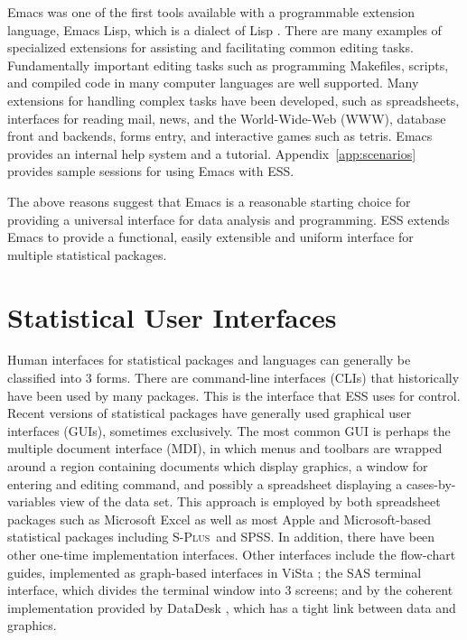 \documentclass{article}
\newcommand*{\Splus}{\textsc{S-Plus}}
\begin{document}
Emacs was one of the first tools available with a programmable
extension language, Emacs Lisp, which is a dialect of Lisp
\citep{RChassell1999,PGraham:1996}.  There are many examples of
specialized extensions for assisting and facilitating common editing
tasks.  Fundamentally important editing tasks such as programming
Makefiles, scripts, and compiled code in many computer languages are
well supported.  Many extensions for handling complex tasks have been
developed, such as spreadsheets, interfaces for reading mail, news,
and the World-Wide-Web (WWW), database front and backends, forms
entry, and interactive games such as tetris.  Emacs provides an
internal help system and a tutorial.  Appendix~\ref{app:scenarios}
provides sample sessions for using Emacs with ESS.

The above reasons suggest that Emacs is a reasonable starting choice
for providing a universal interface for data analysis and programming.
ESS extends Emacs to provide a functional, easily extensible and uniform
interface for multiple statistical packages.  


\section{Statistical User Interfaces}
\label{sec:UI}

Human interfaces for statistical packages and languages can generally
be classified into 3 forms.  There are command-line interfaces (CLIs)
that historically have been used by many packages.  This is the
interface that ESS uses for control.  Recent versions of statistical
packages have generally used graphical user interfaces (GUIs),
sometimes exclusively.  The most common GUI is perhaps the multiple
document interface (MDI), in which menus and toolbars are wrapped
around a region containing documents which display graphics, a window
for entering and editing command, and possibly a spreadsheet
displaying a cases-by-variables view of the data set.  This approach
is employed by both spreadsheet packages such as Microsoft Excel as
well as most Apple and Microsoft-based statistical packages including
\Splus\ and SPSS.  In addition, there have been other one-time
implementation interfaces.  Other interfaces include the flow-chart
guides, implemented as graph-based interfaces in ViSta
\citep{youn:lubi:1995}; the SAS terminal interface, which divides the
terminal window into 3 screens; and by the coherent implementation
provided by DataDesk \citep{vell:prat:1989}, which has a tight link
between data and graphics.
\end{document}
